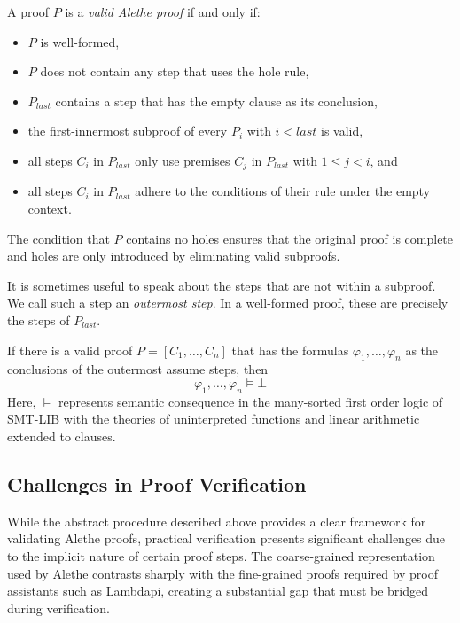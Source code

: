\begin{definition}\label{def:valid-alethe-proof}
A proof $P$ is a \emph{valid Alethe proof} if and only if:
\begin{itemize}
\item $P$ is well-formed,
\item $P$ does not contain any step that uses the hole rule,
\item $P_{\mathit{last}}$ contains a step that has the empty clause as its conclusion,
\item the first-innermost subproof of every $P_i$ with $i < \mathit{last}$ is valid,
\item all steps $C_i$ in $P_{\mathit{last}}$ only use premises $C_j$ in $P_{\mathit{last}}$ with $1 \leq j < i$, and
\item all steps $C_i$ in $P_{\mathit{last}}$ adhere to the conditions of their rule under the empty context.
\end{itemize}
\end{definition}

The condition that $P$ contains no holes ensures that the original proof is
complete and holes are only introduced by eliminating valid subproofs.

It is sometimes useful to speak about the steps that are not within a subproof.
We call such a step an \emph{outermost step}. In a well-formed proof, these are precisely the steps of $P_{\mathit{last}}$.

\begin{theorem}
If there is a valid proof $P = [C_1, \dots , C_n]$ that has the formulas $\varphi_1, \dots, \varphi_n$ as the conclusions of the outermost assume steps, then
\[
  \varphi_1, \dots, \varphi_n \models \bot
\]
Here, $\models$ represents semantic consequence in the many-sorted first order logic of SMT-LIB with the theories of uninterpreted functions and linear arithmetic extended to clauses.
\end{theorem}

\subsection{Challenges in Proof Verification}
\label{ssec:challenge-recon}

While the abstract procedure described above provides a clear framework for validating Alethe proofs,
practical verification presents significant challenges due to the implicit nature of certain proof steps.
The coarse-grained representation used by Alethe contrasts sharply with the fine-grained proofs required
by proof assistants such as Lambdapi, creating a substantial gap that must be bridged during verification.

